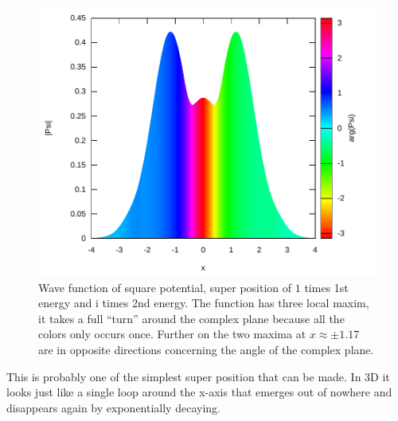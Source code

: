 \documentclass[11pt,DIV=10,final]{scrreprt} %
\newcommand{\mi}{{\text{i}}}
\begin{document}
{\begin{minipage}{\textwidth}
\begin{figure}[H]
\centering
\includegraphics[width=\textwidth]{plots/super-square-1_1-2_i.pdf}
\caption{\label{fig:label} Wave function of square potential, super position of $1$ times 1st energy and $\mi$ times 2nd energy. The function has three local maxim, it takes a full ``turn'' around
    the complex plane because all the colors only occurs once. Further on the two maxima at $x \approx \pm 1.17$ are in opposite directions concerning the angle of the complex plane.}
\end{figure}
This is probably one of the simplest super position that can be made. In 3D it looks just like a single loop around the x-axis that emerges out of nowhere and disappears again by exponentially decaying.
\end{minipage}

}
\end{document}

